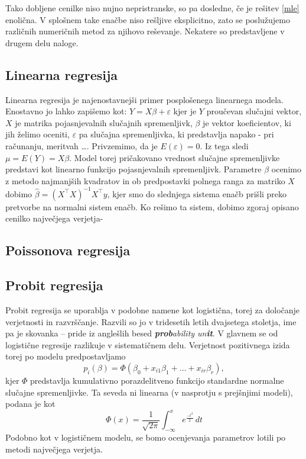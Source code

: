 \documentclass[12pt,a4paper]{amsart}
\theoremstyle{definition} %
\theoremstyle{plain} %
\begin{document}
Tako dobljene cenilke niso nujno nepristranske, so pa dosledne, če je rešitev \eqref{mle} enolična. V splošnem take enačbe niso rešljive eksplicitno, zato se poslužujemo različnih
numeričnih metod za njihovo reševanje. Nekatere so predstavljene v drugem delu naloge.

\subsection{Linearna regresija}
Linearna regresija je najenostavnejši primer posplošenega linearnega modela. Enostavno jo lahko zapišemo kot:
$
    Y = X \beta + \varepsilon
$
kjer je $Y$ proučevan slučajni vektor, $X$ je matrika pojasnjevalnih slučajnih spremenljivk, $\beta$ je vektor koeficientov, ki jih želimo oceniti,
$\varepsilon$ pa slučajna spremenljivka, ki predstavlja napako - pri računanju, meritvah \ldots. Privzemimo, da je $E(\varepsilon) = 0$. Iz tega sledi
$\mu = E(Y) = X\beta$. Model torej pričakovano vrednost slučajne spremenljivke predstavi kot linearno funkcijo pojasnjevalnih spremenljivk.
Parametre $\beta$ ocenimo z metodo najmanjših kvadratov in ob predpostavki polnega ranga za matriko $X$ dobimo $\hat{\beta} =  (X^\top X)^{-1}
X^\top y$, kjer smo do slednjega sistema enačb prišli preko pretvorbe na normalni sistem enačb. Ko rešimo ta sistem, dobimo zgoraj opisano cenilko največjega verjetja-

\subsection{Poissonova regresija}

\subsection{Probit regresija}
Probit regresija se uporablja v podobne namene kot logistična, torej za določanje verjetnosti in razvrščanje. Razvili so jo v tridesetih letih
dvajsetega stoletja, ime pa je skovanka -- pride iz anglešlih besed \textit{\textbf{prob}ability un\textbf{it}}. V glavnem se od logistične regresije
razlikuje v sistematičnem delu. Verjetnost pozitivnega izida torej po modelu predpostavljamo
\begin{equation}
    p_{i}(\beta) = \Phi (\beta_{0} + x_{i1}\beta_{1} + \ldots + x_{ir}\beta_{r}),
\end{equation}
kjer $\Phi$ predstavlja kumulativno porazdelitveno funkcijo standardne normalne slučajne spremenljivke. Ta seveda ni linearna (v nasprotju s prejšnjimi modeli),
podana je kot 
\[
    \Phi(x) = \frac{1}{\sqrt{2\pi}}\int_{-\infty}^{x}e^{\frac{-t^2}{2}}\,dt
\]
Podobno kot v logističnem modelu, se bomo ocenjevanja parametrov lotili po metodi največjega verjetja. 
\end{document}
